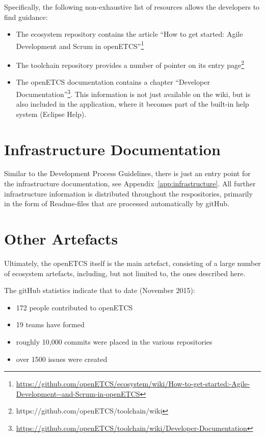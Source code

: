 \documentclass{template/openetcs_report}
\begin{document}
Specifically, the following non-exhaustive list of resources allows the developers to find guidance:

\begin{itemize}
\item The ecosystem repository contains the article ``How to get started: Agile Development and Scrum in openETCS''\footnote{\url{https://github.com/openETCS/ecosystem/wiki/How-to-get-started:-Agile-Development--and-Scrum-in-openETCS}}
\item The toolchain repository provides a number of pointer on its entry page\footnote{https://github.com/openETCS/toolchain/wiki}
\item The openETCS documentation contains a chapter ``Developer Documentation''\footnote{\url{https://github.com/openETCS/toolchain/wiki/Developer-Documentation}}.  This information is not just available on the wiki, but is also included in the application, where it becomes part of the built-in help system (Eclipse Help).
\end{itemize}

\section{Infrastructure Documentation}

Similar to the Development Process Guidelines, there is just an entry point for the infrastructure documentation, see Appendix~\ref{app:infrastructure}.  All further infrastructure information is distributed throughout the respositories, primarily in the form of Readme-files that are processed automatically by gitHub.

\section{Other Artefacts}

Ultimately, the openETCS itself is the main artefact, consisting of a large number of ecosystem artefacts, including, but not limited to, the ones described here.

The gitHub statistics indicate that to date (November 2015):

\begin{itemize}
\item 172 people contributed to openETCS
\item 19 teams have formed
\item roughly 10,000 commits were placed in the various repositories
\item over 1500 issues were created
\end{itemize}
\end{document}
